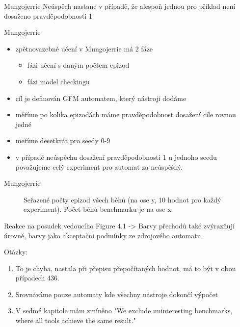 \documentclass[
]{beamer}
\begin{document}
	\begin{frame}{Mungojerrie}
		Neúspěch nastane v případě, že alespoň jednou pro příklad není dosaženo pravděpodobnosti 1
		\begin{table}[ht]
			\centering
			
			\caption{Počty nejlepších výsledků z Mungojerrie }
			\label{Table:mungostatsnoex}
			
		\end{table}
	\end{frame}
\begin{frame}{Mungojerrie}
	\begin{itemize}
		\item zpětnovazebné učení v Mungojerrie má 2 fáze
		\begin{itemize}
			\item fázi učení s daným počtem epizod
			\item fázi model checkingu
		\end{itemize}
		\item cíl je definován GFM automatem, který nástroji dodáme
		\item měříme po kolika epizodách máme pravděpodobnost dosažení cíle rovnou jedné
		\item meříme desetkrát pro seedy 0-9
		\item v případě neúspěchu dosažení pravděpodobnosti 1 u jednoho seedu považujeme celý experiment pro automat za neúspěšný.
	\end{itemize}
		
\end{frame}
\begin{frame}{Mungojerrie}
\begin{figure}
	\centering
	
	\caption{Seřazené počty epizod všech běhů (na ose y, 10 hodnot pro každý experiment). Počet běhů benchmarku je na ose x. }
	\label{Cactus:mungoruns}
	
\end{figure}

\end{frame}


\begin{frame}

	
\end{frame}





	\begin{frame}{Reakce na posudek vedoucího}
		Figure 4.1 -> Barvy přechodů také zvýrazňují úrovně, barvy jako akceptační podmínky ze zdrojového automatu.
		\pause
		
		Otázky:
		\begin{enumerate}
			\item To je chyba, nastala při přepisu přepočítaných hodnot, má to být v obou případech 436.
			\pause
			\item Srovnáváme pouze automaty kde všechny nástroje dokončí výpočet
			\pause
			\item V sedmé kapitole mám zmíněno "We exclude uninteresting benchmarks, where all tools achieve the same result."
		\end{enumerate}
		
		
	\end{frame}
	
\end{document}
